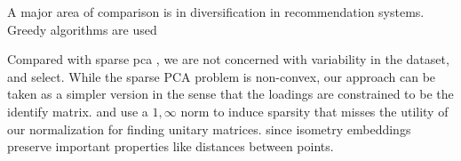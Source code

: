 \documentclass[a4paper,11pt]{article}
\begin{document}



A major area of comparison is in diversification in recommendation systems.  Greedy algorithms are used \cite{Carbonell2017-gi, Wu2019-uk}

Compared with sparse pca \cite{Bertsimas2022-qo, Bertsimas2022-dv}, we are not concerned with variability in the dataset, and select.
While the sparse PCA problem is non-convex, our approach can be taken as a simpler version in the sense that the loadings are constrained to be the identify matrix.
\cite{Tropp06-sg} and \cite{Liu2009-yo} use a $1,\infty$ norm to induce sparsity that misses the utility of our normalization for finding unitary matrices.
since isometry embeddings preserve important properties like distances between points.
\end{document}
